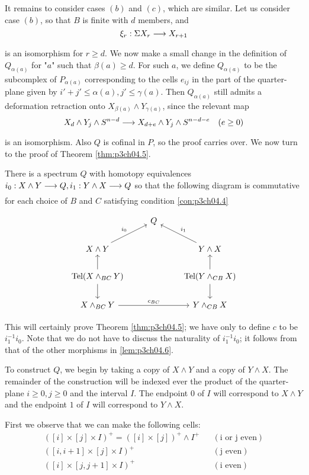 \documentclass[../main]{subfiles}
\begin{document}
It remains to consider cases $(b)$ and $(c)$, which are similar. Let us consider case $(b)$, so that $B$ is finite with $d$ members, and 
\[\xi_r:\Sigma X_r\lar{}X_{r+1}\] is an isomorphism for $r\geq d$. We now make a small change in the definition of $Q_{\alpha(a)}$ for "$a$" such that $\beta(a)\geq d$. For such $a$, we define $Q_{\alpha(a)}$ to be the subcomplex of $P_{\alpha(a)}$ corresponding to the cells $e_{ij}$ in the part of the quarter-plane given by $i'+j'\leq \alpha(a),j'\leq  \gamma(a)$. Then $Q_{\alpha(a)}$ still admits a deformation retraction onto $X_{\beta(a)}\wedge Y_{\gamma(a)}$, since the relevant map
\[X_d\wedge Y_j \wedge S^{n-d} \lar{} X_{d+e} \wedge Y_j \wedge S^{n-d-e}\quad (e\geq 0)\]
is an isomorphism. Also $Q$ is cofinal in $P$, so the proof carries over. We now turn to the proof of Theorem \ref{thm:p3ch04.5}.
\begin{lemma}\label{lem:p3ch04.6}
There is a spectrum $Q$ with homotopy equivalences $i_0:X\wedge Y\lar{} Q,i_1:Y\wedge X\lar{} Q$ so that the following diagram is commutative for each choice of $B$ and $C$ satisfying condition \ref{con:p3ch04.4}

\[\begin{tikzcd}
    & Q \\
    {X\wedge Y} && {Y\wedge X} \\
    {\text{Tel}(X\wedge_{BC}Y)} && {\text{Tel}(Y\wedge_{CB}X)} \\
    {X\wedge_{BC}Y} && {Y\wedge_{CB}X}
    \arrow["{c_{BC}}", from=4-1, to=4-3]
    \arrow[from=3-1, to=4-1]
    \arrow[from=3-1, to=2-1]
    \arrow[from=3-3, to=2-3]
    \arrow[from=3-3, to=4-3]
    \arrow["{i_0}", from=2-1, to=1-2]
    \arrow["{i_1}"', from=2-3, to=1-2]
\end{tikzcd}\]
\end{lemma}

This will certainly prove Theorem \ref{thm:p3ch04.5}; we have only to define $c$ to be $i_1^{-1}i_0$. Note that we do not have to discuss the naturality of $i_1^{-1} i_0$; it follows from that of the other morphisms in \ref{lem:p3ch04.6}.

To construct $Q$, we begin by taking a copy of $X\wedge Y$ and a copy of $Y\wedge X$. The remainder of the construction will be indexed ever the product
of the quarter-plane $i\geq 0,j\geq 0$ and the interval $I$. The endpoint $0$ of $I$ will correspond to $X\wedge Y$ and the endpoint $1$ of $I$ will correspond to $Y\wedge X$.

First we observe that we can make the following cells:
\begin{align*}
    ([i]\times[j]\times I)^+=([i]\times [j])^+\wedge I^+ && (\text{i or j even})\\
    ([i,i+1]\times [j]\times I)^+ && (\text{j even})\\
    ([i]\times [j,j+1]\times I)^+ && (\text{i even})
\end{align*}
\end{document}
